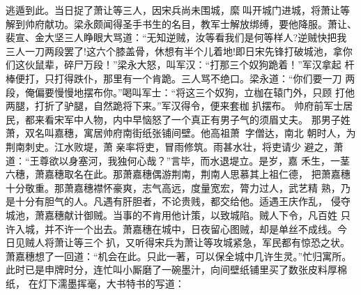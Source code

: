 逃遁到此。当日捉了萧让等三人，因宋兵尚未围城，縻叫开城门进城，将萧让等
解到帅府献功。梁永颇闻得圣手书生的名目，教军士解放绑缚，要他降服。萧让、
裴宣、金大坚三人睁眼大骂道：“无知逆贼，汝等看我们是何等样人?逆贼快把我
三人一刀两段罢了!这六个膝盖骨，休想有半个儿着地!即日宋先锋打破城池，拿你
们这伙鼠辈，碎尸万段！”梁永大怒，叫军汉：“打那三个奴狗跪着！”军汉拿起
杆棒便打，只打得跌仆，那里有一个肯跪。三人骂不绝口。梁永道：“你们要一刀
两段，俺偏要慢慢地摆布你。”喝叫军士：“将这三个奴狗，立枷在辕门外，只顾
打他两腿，打折了驴腿，自然跪将下来。”军汉得令，便来套枷扒摆布。
帅府前军士居民，都来看宋军中人物，内中早恼怒了一个真正有男子气的须眉丈夫。
那男子姓萧，双名叫嘉穗，寓居帅府南街纸张铺间壁。他高祖萧，字僧达，南北
朝时人，为荆南刺史。江水败堤，萧亲率将吏，冒雨修筑。雨甚水壮，将吏请少
避之，萧道：“王尊欲以身塞河，我独何心哉？”言毕，而水退堤立。是岁，嘉
禾生，一茎六穗，萧嘉穗取名在此。那萧嘉穗偶游荆南，荆南人思慕其上祖仁德，
把萧嘉穗十分敬重。那萧嘉穗襟怀豪爽，志气高远，度量宽宏，膂力过人，武艺精
熟，乃是十分有胆气的人。凡遇有肝胆者，不论贵贱，都交给他。适遇王庆作乱，
侵夺城池，萧嘉穗献计御贼。当事的不肯用他计策，以致城陷。贼人下令，凡百姓
只许入城，并不许一个出去。萧嘉穗在城中，日夜留心图贼，却是单丝不成线。今
日见贼人将萧让等三个扒，又听得宋兵为萧让等攻城紧急，军民都有惊恐之状。
萧嘉穗想了一回道：“机会在此。只此一著，可以保全城中几许生灵。”忙归寓所。
此时已是申牌时分，连忙叫小厮磨了一碗墨汁，向间壁纸铺里买了数张皮料厚棉纸，
在灯下濡墨挥毫，大书特书的写道：

